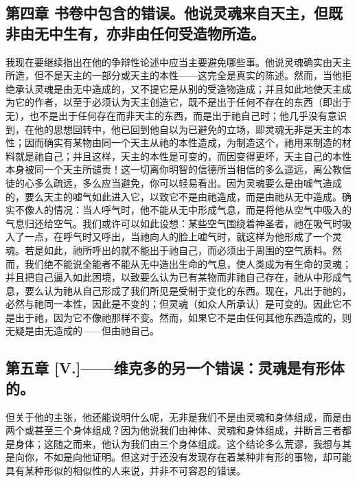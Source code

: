 
\subsection{第四章 书卷中包含的错误。他说灵魂来自天主，但既非由无中生有，亦非由任何受造物所造。}

我现在要继续指出在他的争辩性论述中应当主要避免哪些事。他说灵魂确实由天主所造，但不是天主的一部分或天主的本性——这完全是真实的陈述。然而，当他拒绝承认灵魂是由无中造成的，又不提它是从别的受造物造成；并且如此地使天主成为它的作者，以至于必须认为天主创造它，既不是出于任何不存在的东西（即出于无），也不是出于任何存在而非天主的东西，而是出于祂自己时；他几乎没有意识到，在他的思想回转中，他已回到他自以为已避免的立场，即灵魂无非是天主的本性；因而确实有某物由同一个天主从祂的本性造成，为制造这个，祂用来制造的材料就是祂自己；并且这样，天主的本性是可变的，而因变得更坏，天主自己的本性本身被同一个天主所谴责！这一切离你明智的信德所当相信的多么遥远，离公教信徒的心多么疏远，多么应当避免，你可以轻易看出。因为灵魂要么是由嘘气造成的，要么天主的嘘气如此进入它，以致它不是由祂造成，而是由祂从无中造成。确实不像人的情况：当人呼气时，他不能从无中形成气息，而是将他从空气中吸入的气息归还给空气。我们或许可以如此设想：某些空气围绕着神圣者，祂在吸气时吸入了一点，在呼气时又呼出，当祂向人的脸上嘘气时，就这样为他形成了一个灵魂。若是如此，祂所呼出的就不能出于祂自己，而必须出于周围的空气质料。然而，我们绝不能说全能者不能从无中造出生命的气息，使人类成为有生命的灵魂；并且把自己逼入如此困境，以致要么认为已有某物而非祂自己存在，祂从中形成气息，要么认为祂从自己形成了我们所见是受制于变化的东西。现在，凡出于祂的，必然与祂同一本性，因此是不变的；但灵魂（如众人所承认）是可变的。因此它不是出于祂，因为它不像祂那样不变。然而，如果它不是由任何其他东西造成的，则无疑是由无造成的——但由祂自己。\par


\subsection{第五章 [V.]——维克多的另一个错误：灵魂是有形体的。}

但关于他的主张，他还能说明什么呢，无非是我们不是由灵魂和身体组成，而是由两个或甚至三个身体组成？因为他说我们由神体、灵魂和身体组成，并断言三者都是身体；这随之而来，他认为我们由三个身体组成。这个结论多么荒谬，我想与其是向你，不如是向他证明。但这对于还没有发现存在着某种非有形的事物，却可能具有某种形似的相似性的人来说，并非不可容忍的错误。\par


